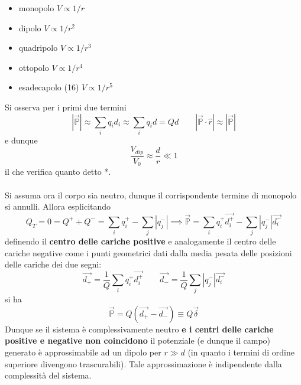 \begin{itemize}
\item monopolo \dotfill $V \propto 1/r$
\item dipolo \dotfill $V \propto 1/r^2$
\item quadripolo \dotfill $V \propto 1/r^3$
\item ottopolo \dotfill $V \propto 1/r^4$
\item esadecapolo (16) \dotfill $V \propto 1/r^5$
\end{itemize}
Si osserva per i primi due termini
\[|\vec{\mathbb{P}}| \approx \sum_i q_i d_i \approx \sum_i q_i d = Q d \qquad |\vec{\mathbb{P}} \cdot \hat{r}| \approx |\vec{\mathbb{P}}|\]
e dunque
\[\frac{V_{dip}}{V_0} \approx \frac{d}{r} \ll 1\]
il che verifica quanto detto *.
\\~\\
Si assuma ora il corpo sia neutro, dunque il corrispondente termine di monopolo si annulli. Allora esplicitando
\[Q_T = 0 = Q^+ + Q^- = \sum_i q_i^+ - \sum_j |q_j^-| \implies \vec{\mathbb{P}} = \sum_i q_i^+ \vec{d_i^+} - \sum_j |q_j^-| \vec{d_i^-}\]
definendo il \textbf{centro delle cariche positive} e analogamente il centro delle cariche negative come i punti geometrici dati dalla media pesata delle posizioni delle cariche dei due segni:
\[\vec{d_+} = \frac{1}{Q} \sum_i q_i^+ \vec{d_i^+} \qquad \vec{d_-} = \frac{1}{Q} \sum_j |q_j^-| \vec{d_i^-}\]
si ha
\[\vec{\mathbb{P}} = Q(\vec{d_+} - \vec{d_-}) \equiv Q \vec{\delta}\]
Dunque se il sistema è complessivamente neutro \textbf{e i centri delle cariche positive e negative non coincidono} il potenziale (e dunque il campo) generato è approssimabile ad un dipolo per $r \gg d$ (in quanto i termini di ordine superiore divengono trascurabili). Tale approssimazione è indipendente dalla complessità del sistema.

